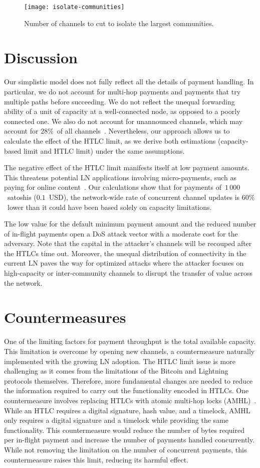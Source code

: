 \begin{figure}[tb]
	\centering
	\texttt{[image: isolate-communities]}
	\caption{Number of channels to cut to isolate the largest communities.}
	\label{fig:isolate-communities}
\end{figure}


\section{Discussion}
Our simplistic model does not fully reflect all the details of payment handling.
In particular, we do not account for multi-hop payments and payments that try multiple paths before succeeding.
We do not reflect the unequal forwarding ability of a unit of capacity at a well-connected node, as opposed to a poorly connected one.
We also do not account for unannounced channels, which may account for $28\%$~of all channels~\cite{BitMEXPrivateChannels}.
Nevertheless, our approach allows us to calculate the effect of the HTLC limit, as we derive both estimations (capacity-based limit and HTLC limit)  under the same assumptions.

The negative effect of the HTLC limit manifests itself at low payment amounts.
This threatens potential LN applications involving micro-payments, such as paying for online content~\cite{Poon2016}.
Our calculations show that for payments of~$1\,000$~satoshis ($0.1$~USD), the network-wide rate of concurrent channel updates is $60\%$~lower than it could have been based solely on capacity limitations.

The low value for the default minimum payment amount and the reduced number of in-flight payments open a DoS attack vector with a moderate cost for the adversary.
Note that the capital in the attacker's channels will be recouped after the HTLCs time out.
Moreover, the unequal distribution of connectivity in the current LN paves the way for optimized attacks where the attacker focuses on high-capacity or inter-community channels to disrupt the transfer of value across the network.


\section{Countermeasures}
One of the limiting factors for payment throughput is the total available capacity.
This limitation is overcome by opening new channels, a countermeasure naturally implemented with the growing LN adoption.
The HTLC limit issue is more challenging as it comes from the limitations of the Bitcoin and Lightning protocols themselves.
Therefore, more fundamental changes are needed to reduce the information required to carry out the functionality encoded in HTLCs.
One countermeasure involves replacing HTLCs with atomic multi-hop locks (AMHL)~\cite{Malavolta2019}.
While an HTLC requires a digital signature, hash value, and a timelock, AMHL only requires a digital signature and a timelock while providing the same functionality.
This countermeasure would reduce the number of bytes required per in-flight payment and increase the number of payments handled concurrently.
While not removing the limitation on the number of concurrent payments, this countermeasure raises this limit, reducing its harmful effect.

